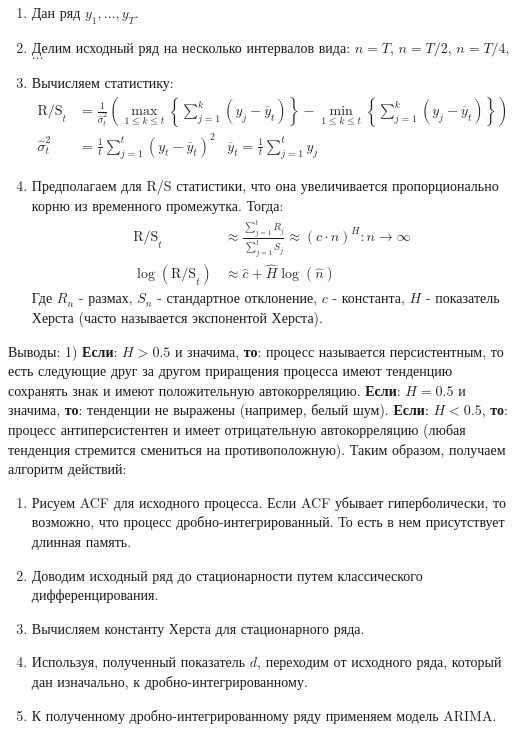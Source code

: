 \begin{enumerate}
	\item Дан ряд $y_1, \ldots, y_{T}$.
	\item Делим исходный ряд на несколько интервалов вида: $n = T$, $n = T / 2$, $n = T / 4$, $\ldots$
	\item Вычисляем статистику:
	\begin{equation}
		\begin{split}
			\text{R/S}_t & = \frac{1}{\hat{\sigma}^2_t} \left(\max_{1 \le k \le t} \left\{\sum_{j = 1}^k (y_j - \overline{y}_t)\right\} - \min_{1 \le k \le t} \left\{\sum_{j = 1}^k (y_j - \overline{y}_t)\right\}\right)\\
			\hat{\sigma}^2_t & = \frac{1}{t} \sum_{j = 1}^t (y_t - \overline{y}_t)^2 \;\;\; \overline{y}_t = \frac{1}{t} \sum_{j = 1}^t y_j
		\end{split}		
	\end{equation}
	\item Предполагаем для R/S статистики, что она увеличивается пропорционально корню из временного промежутка. Тогда:
	\begin{equation}
		\begin{split}
			\text{R/S}_t & \approx \frac{\sum_{j = 1}^t R_j}{\sum_{j = 1}^t S_j} \approx (c \cdot n)^H: n \to \infty\\
			\log\left(\text{R/S}_t\right) & \approx \hat{c} + \hat{H} \log(\hat{n})
		\end{split}
	\end{equation}
	Где $R_n$ - размах, $S_n$ - стандартное отклонение, $c$ - константа, $H$ - показатель Херста (часто называется экспонентой Херста).
\end{enumerate}
Выводы: 1) \textbf{Если}: $H > 0.5$ и значима, \textbf{то}: процесс называется персистентным, то есть следующие друг за другом приращения процесса имеют тенденцию сохранять знак и имеют положительную автокорреляцию. \textbf{Если}: $H = 0.5$ и значима, \textbf{то}: тенденции не выражены (например, белый шум). \textbf{Если}: $H < 0.5$, \textbf{то}: процесс антиперсистентен и имеет отрицательную автокорреляцию (любая тенденция стремится смениться на противоположную). Таким образом, получаем алгоритм действий:
\begin{enumerate}
	\item Рисуем ACF для исходного процесса. Если ACF убывает гиперболически, то возможно, что процесс дробно-интегрированный. То есть в нем присутствует длинная память.
	\item Доводим исходный ряд до стационарности путем классического дифференцирования.
	\item Вычисляем константу Херста для стационарного ряда.
	\item Используя, полученный показатель $d$, переходим от исходного ряда, который дан изначально, к дробно-интегрированному.
	\item К полученному дробно-интегрированному ряду применяем модель ARIMA.
\end{enumerate}
